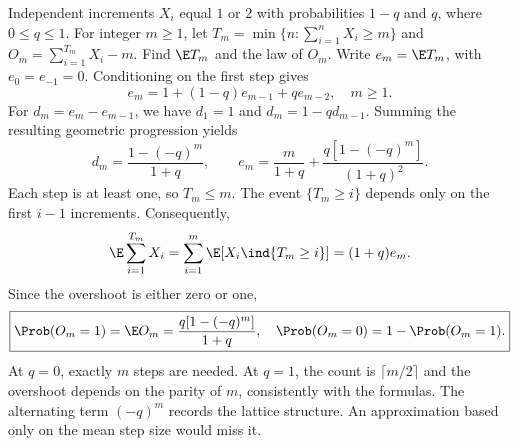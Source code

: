 Independent increments $X_i$ equal $1$ or $2$ with probabilities $1-q$ and $q$, where $0\le q\le1$. For integer $m\ge1$, let $T_m=\min\{n:\sum_{i=1}^nX_i\ge m\}$ and $O_m=\sum_{i=1}^{T_m}X_i-m$. Find $\E T_m$ and the law of $O_m$.
\solution Write $e_m=\E T_m$, with $e_0=e_{-1}=0$. Conditioning on the first step gives
\[
e_m=1+(1-q)e_{m-1}+qe_{m-2},\quad m\ge1.
\]
For $d_m=e_m-e_{m-1}$, we have $d_1=1$ and $d_m=1-qd_{m-1}$. Summing the resulting geometric progression yields
\[
d_m=\frac{1-(-q)^m}{1+q},\qquad
\boxed{e_m=\frac m{1+q}+\frac{q[1-(-q)^m]}{(1+q)^2}.}
\]
Each step is at least one, so $T_m\le m$. The event $\{T_m\ge i\}$ depends only on the first $i-1$ increments. Consequently,
\[
\E\sum_{i=1}^{T_m}X_i
=\sum_{i=1}^m\E[X_i\ind\{T_m\ge i\}]
=(1+q)e_m.
\]
Since the overshoot is either zero or one,
\[
\boxed{\Prob(O_m=1)=\E O_m
=\frac{q[1-(-q)^m]}{1+q},\quad
\Prob(O_m=0)=1-\Prob(O_m=1).}
\]
At $q=0$, exactly $m$ steps are needed. At $q=1$, the count is $\lceil m/2\rceil$ and the overshoot depends on the parity of $m$, consistently with the formulas.
\insight The alternating term $(-q)^m$ records the lattice structure. An approximation based only on the mean step size would miss it.

